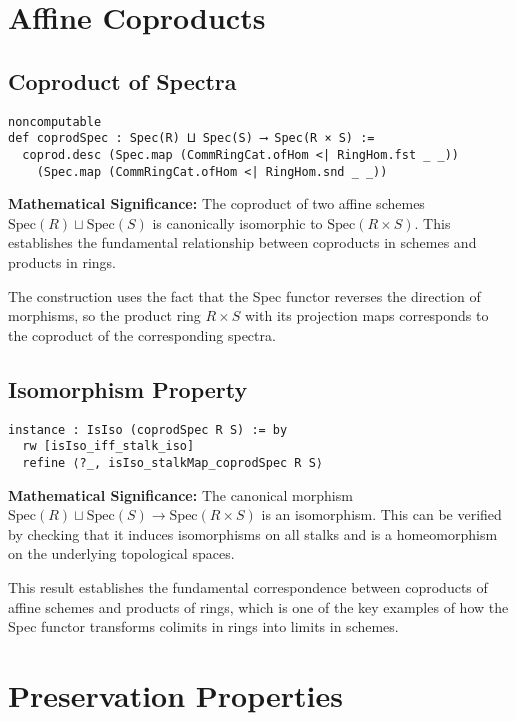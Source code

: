 \documentclass{article}
\theoremstyle{definition}
\begin{document}
\section{Affine Coproducts}

\subsection{Coproduct of Spectra}

\begin{lstlisting}
noncomputable
def coprodSpec : Spec(R) ⨿ Spec(S) ⟶ Spec(R × S) :=
  coprod.desc (Spec.map (CommRingCat.ofHom <| RingHom.fst _ _))
    (Spec.map (CommRingCat.ofHom <| RingHom.snd _ _))
\end{lstlisting}

\textbf{Mathematical Significance:} The coproduct of two affine schemes $\mathrm{Spec}(R) \sqcup \mathrm{Spec}(S)$ is canonically isomorphic to $\mathrm{Spec}(R \times S)$. This establishes the fundamental relationship between coproducts in schemes and products in rings.

The construction uses the fact that the Spec functor reverses the direction of morphisms, so the product ring $R \times S$ with its projection maps corresponds to the coproduct of the corresponding spectra.

\subsection{Isomorphism Property}

\begin{lstlisting}
instance : IsIso (coprodSpec R S) := by
  rw [isIso_iff_stalk_iso]
  refine ⟨?_, isIso_stalkMap_coprodSpec R S⟩
\end{lstlisting}

\textbf{Mathematical Significance:} The canonical morphism $\mathrm{Spec}(R) \sqcup \mathrm{Spec}(S) \to \mathrm{Spec}(R \times S)$ is an isomorphism. This can be verified by checking that it induces isomorphisms on all stalks and is a homeomorphism on the underlying topological spaces.

This result establishes the fundamental correspondence between coproducts of affine schemes and products of rings, which is one of the key examples of how the Spec functor transforms colimits in rings into limits in schemes.

\section{Preservation Properties}
\end{document}
